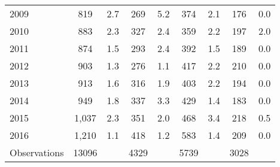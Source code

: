 \begin{table}[htbp]
\begin{tabular}{l*{4}{cc}}
2009            &      819&      2.7&      269&      5.2&      374&      2.1&      176&      0.0\\
2010            &      883&      2.3&      327&      2.4&      359&      2.2&      197&      2.0\\
2011            &      874&      1.5&      293&      2.4&      392&      1.5&      189&      0.0\\
2012            &      903&      1.3&      276&      1.1&      417&      2.2&      210&      0.0\\
2013            &      913&      1.6&      316&      1.9&      403&      2.2&      194&      0.0\\
2014            &      949&      1.8&      337&      3.3&      429&      1.4&      183&      0.0\\
2015            &    1,037&      2.3&      351&      2.0&      468&      3.4&      218&      0.5\\
2016            &    1,210&      1.1&      418&      1.2&      583&      1.4&      209&      0.0\\
\hline
Observations    &    13096&         &     4329&         &     5739&         &     3028&         \\
\hline\hline
\end{tabular}
\end{table}
